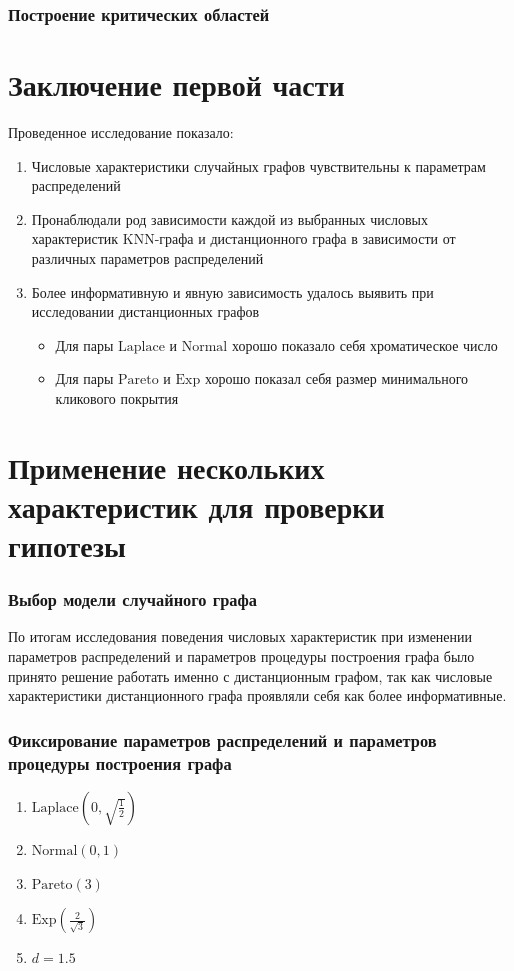 \documentclass[a4paper,12pt]{article}
\begin{document}
\subsubsection{Построение критических областей}

\section{Заключение первой части}
Проведенное исследование показало:
\begin{enumerate}
    \item Числовые характеристики случайных графов чувствительны к параметрам распределений

    \item Пронаблюдали род зависимости каждой из выбранных числовых характеристик KNN-графа и дистанционного графа в зависимости от различных параметров распределений
    
    \item Более информативную и явную зависимость удалось выявить при исследовании дистанционных графов
    \begin{itemize}
        \item Для пары $\text{Laplace}$ и $\text{Normal}$ хорошо показало себя хроматическое число

        \item Для пары $\text{Pareto}$ и $\text{Exp}$ хорошо показал себя размер минимального кликового покрытия
    \end{itemize}
\end{enumerate}

\section{Применение нескольких характеристик для проверки гипотезы}

\subsubsection{Выбор модели случайного графа}
По итогам исследования поведения числовых характеристик при изменении параметров распределений и параметров процедуры построения графа было принято решение работать именно с дистанционным графом, так как числовые характеристики дистанционного графа проявляли себя как более информативные.


\subsubsection{Фиксирование параметров распределений и параметров процедуры построения графа}
\begin{enumerate}
    \item $\text{Laplace}\left( 0, \sqrt{\frac{1}{2}}\right)$
    \item $\text{Normal} \left(0, 1 \right)$
    \item $\text{Pareto} (3)$
    \item $\text{Exp} \left(\frac{2}{\sqrt{3}} \right)$
    \item $d = 1.5$
\end{enumerate}
\end{document}
